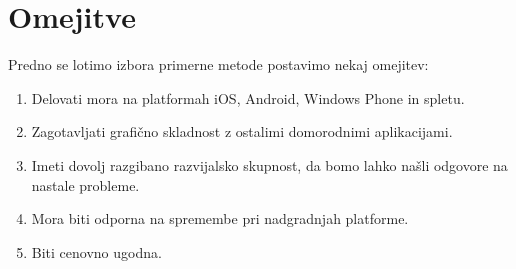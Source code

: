 \begin{table}
\footnotesize
{}
\caption{Razpredelnica izjem pri uporabi pravil za ponavljanje dogodkov. \textbf{Izjema 1:} omeji če je prisotno pravilo \texttt{BYMONTHDAY}, drugače razširi. \textbf{Izjema 2:} omeji za pravili \texttt{BYYEARDAY} in \texttt{BYMONTHDAY}, drugače razširi. }
\label{table:rrule-behavior}
\end{table}

\section{Omejitve}

Predno se lotimo izbora primerne metode postavimo nekaj omejitev:

\begin{enumerate}
  \item Delovati mora na platformah iOS, Android, Windows Phone in spletu.
  \item Zagotavljati grafično skladnost z ostalimi domorodnimi aplikacijami.
  \item Imeti dovolj razgibano razvijalsko skupnost, da bomo lahko našli odgovore na nastale probleme.
  \item Mora biti odporna na spremembe pri nadgradnjah platforme.
  \item Biti cenovno ugodna.
\end{enumerate}

